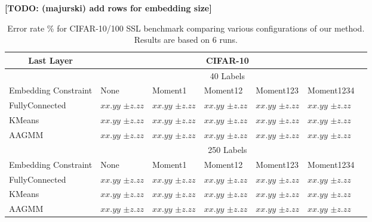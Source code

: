 \documentclass[10pt,twocolumn,letterpaper]{article}
\newcommand{\TODO}[1]{\textbf{\color{red}[TODO: #1]}}
\begin{document}
\TODO {(majurski) add rows for embedding size}
\begin{table*}[ht!]
	\begin{tabularx}{\textwidth}{c|XXXXXX}
		\multicolumn{1}{c|}{Last Layer}           & \multicolumn{5}{c}{CIFAR-10} \\ \hline\hline
		\multicolumn{1}{c|}{}     & \multicolumn{5}{c}{40 Labels}            \\ \hline
		\multicolumn{1}{c|}{Embedding Constraint} & None & Moment1 & Moment12 & Moment123 & Moment1234  \\ \hline
		\multicolumn{1}{l|}{FullyConnected}   & $xx.yy$ \scriptsize{$\pm z.zz$}   & $xx.yy$ \scriptsize{$\pm z.zz$} & $xx.yy$ \scriptsize{$\pm z.zz$} & $xx.yy$ \scriptsize{$\pm z.zz$} & $xx.yy$ \scriptsize{$\pm z.zz$}  \\
		\multicolumn{1}{l|}{KMeans}  & $xx.yy$ \scriptsize{$\pm z.zz$}    & $xx.yy$ \scriptsize{$\pm z.zz$} & $xx.yy$ \scriptsize{$\pm z.zz$} & $xx.yy$ \scriptsize{$\pm z.zz$} & $xx.yy$ \scriptsize{$\pm z.zz$}  \\
		\multicolumn{1}{l|}{AAGMM}   & $xx.yy$ \scriptsize{$\pm z.zz$}    & $xx.yy$ \scriptsize{$\pm z.zz$} & $xx.yy$ \scriptsize{$\pm z.zz$} & $xx.yy$ \scriptsize{$\pm z.zz$} & $xx.yy$ \scriptsize{$\pm z.zz$} \\
		\hline\hline
		\multicolumn{1}{c|}{}     & \multicolumn{5}{c}{250 Labels}            \\ \hline
		\multicolumn{1}{c|}{Embedding Constraint} & None & Moment1 & Moment12 & Moment123 & Moment1234  \\ \hline
		\multicolumn{1}{l|}{FullyConnected}   & $xx.yy$ \scriptsize{$\pm z.zz$}   & $xx.yy$ \scriptsize{$\pm z.zz$} & $xx.yy$ \scriptsize{$\pm z.zz$} & $xx.yy$ \scriptsize{$\pm z.zz$} & $xx.yy$ \scriptsize{$\pm z.zz$}  \\
		\multicolumn{1}{l|}{KMeans}  & $xx.yy$ \scriptsize{$\pm z.zz$}    & $xx.yy$ \scriptsize{$\pm z.zz$} & $xx.yy$ \scriptsize{$\pm z.zz$} & $xx.yy$ \scriptsize{$\pm z.zz$} & $xx.yy$ \scriptsize{$\pm z.zz$}  \\
		\multicolumn{1}{l|}{AAGMM}   & $xx.yy$ \scriptsize{$\pm z.zz$}    & $xx.yy$ \scriptsize{$\pm z.zz$}& $xx.yy$ \scriptsize{$\pm z.zz$} & $xx.yy$ \scriptsize{$\pm z.zz$} & $xx.yy$ \scriptsize{$\pm z.zz$}  \\
	\end{tabularx}
	\caption{Error rate \% for CIFAR-10/100 SSL benchmark comparing various configurations of our method. Results are based on 6 runs.}
	\label{table1}
	
\end{table*}
\end{document}
